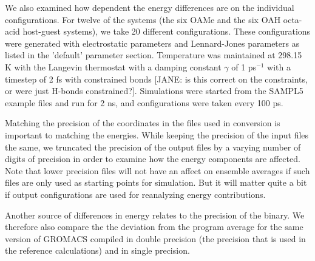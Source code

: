 We also examined how dependent the energy differences are on the
individual configurations. For twelve of the systems (the six OAMe and
the six OAH octa-acid host-guest systems), we take 20 different
configurations. These configurations were generated with electrostatic
parameters and Lennard-Jones parameters as listed in the 'default'
parameter section. Temperature was maintained at 298.15 K with the
Langevin thermostat with a damping constant $\gamma$ of 1 ps$^{-1}$
with a timestep of 2 fs with constrained bonds [JANE: is this correct
  on the constraints, or were just H-bonds constrained?]. Simulations
were started from the SAMPL5 example files and run for 2 ns, and
configurations were taken every 100 ps.

Matching the precision of the coordinates in the files used in
conversion is important to matching the energies. While keeping the
precision of the input files the same, we truncated the precision of
the output files by a varying number of digits of precision in order
to examine how the energy components are affected. Note that lower
precision files will not have an affect on ensemble averages if such
files are only used as starting points for simulation. But it will
matter quite a bit if output configurations are used for reanalyzing
energy contributions.

Another source of differences in energy relates to the precision of
the binary.  We therefore also compare the the deviation from the
program average for the same version of GROMACS compiled in double
precision (the precision that is used in the reference calculations)
and in single precision.


